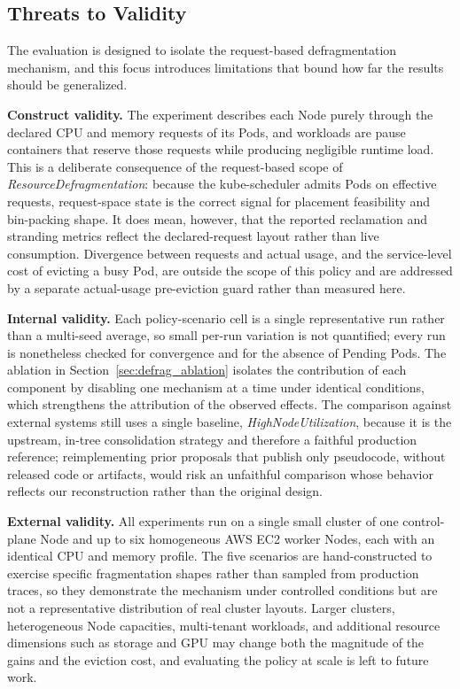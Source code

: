 \subsection{Threats to Validity}
\label{sec:defrag_threats}

The evaluation is designed to isolate the request-based defragmentation mechanism, and this focus introduces limitations that bound how far the results should be generalized.

\textbf{Construct validity.} The experiment describes each Node purely through the declared CPU and memory requests of its Pods, and workloads are pause containers that reserve those requests while producing negligible runtime load. This is a deliberate consequence of the request-based scope of \textit{ResourceDefragmentation}: because the kube-scheduler admits Pods on effective requests, request-space state is the correct signal for placement feasibility and bin-packing shape. It does mean, however, that the reported reclamation and stranding metrics reflect the declared-request layout rather than live consumption. Divergence between requests and actual usage, and the service-level cost of evicting a busy Pod, are outside the scope of this policy and are addressed by a separate actual-usage pre-eviction guard rather than measured here.

\textbf{Internal validity.} Each policy-scenario cell is a single representative run rather than a multi-seed average, so small per-run variation is not quantified; every run is nonetheless checked for convergence and for the absence of Pending Pods. The ablation in Section~\ref{sec:defrag_ablation} isolates the contribution of each component by disabling one mechanism at a time under identical conditions, which strengthens the attribution of the observed effects. The comparison against external systems still uses a single baseline, \textit{HighNodeUtilization}, because it is the upstream, in-tree consolidation strategy and therefore a faithful production reference; reimplementing prior proposals that publish only pseudocode, without released code or artifacts, would risk an unfaithful comparison whose behavior reflects our reconstruction rather than the original design.

\textbf{External validity.} All experiments run on a single small cluster of one control-plane Node and up to six homogeneous AWS EC2 worker Nodes, each with an identical CPU and memory profile. The five scenarios are hand-constructed to exercise specific fragmentation shapes rather than sampled from production traces, so they demonstrate the mechanism under controlled conditions but are not a representative distribution of real cluster layouts. Larger clusters, heterogeneous Node capacities, multi-tenant workloads, and additional resource dimensions such as storage and GPU may change both the magnitude of the gains and the eviction cost, and evaluating the policy at scale is left to future work.

